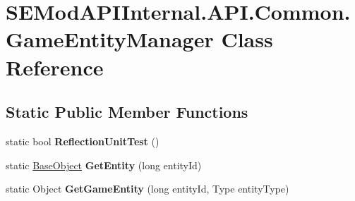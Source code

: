 \hypertarget{class_s_e_mod_a_p_i_internal_1_1_a_p_i_1_1_common_1_1_game_entity_manager}{}\section{S\+E\+Mod\+A\+P\+I\+Internal.\+A\+P\+I.\+Common.\+Game\+Entity\+Manager Class Reference}
\label{class_s_e_mod_a_p_i_internal_1_1_a_p_i_1_1_common_1_1_game_entity_manager}
\subsection*{Static Public Member Functions}
\begin{DoxyCompactItemize}
\item 
\hypertarget{class_s_e_mod_a_p_i_internal_1_1_a_p_i_1_1_common_1_1_game_entity_manager_a61f866dcecfda06a75e1c6e0af54aea7}{}static bool {\bfseries Reflection\+Unit\+Test} ()\label{class_s_e_mod_a_p_i_internal_1_1_a_p_i_1_1_common_1_1_game_entity_manager_a61f866dcecfda06a75e1c6e0af54aea7}

\item 
\hypertarget{class_s_e_mod_a_p_i_internal_1_1_a_p_i_1_1_common_1_1_game_entity_manager_a635c7f39ad97113062534d6c563fabdd}{}static \hyperlink{class_s_e_mod_a_p_i_internal_1_1_a_p_i_1_1_entity_1_1_base_object}{Base\+Object} {\bfseries Get\+Entity} (long entity\+Id)\label{class_s_e_mod_a_p_i_internal_1_1_a_p_i_1_1_common_1_1_game_entity_manager_a635c7f39ad97113062534d6c563fabdd}

\item 
\hypertarget{class_s_e_mod_a_p_i_internal_1_1_a_p_i_1_1_common_1_1_game_entity_manager_a57135a63a956710cc3cd63f120a56323}{}static Object {\bfseries Get\+Game\+Entity} (long entity\+Id, Type entity\+Type)\label{class_s_e_mod_a_p_i_internal_1_1_a_p_i_1_1_common_1_1_game_entity_manager_a57135a63a956710cc3cd63f120a56323}

\end{DoxyCompactItemize}
